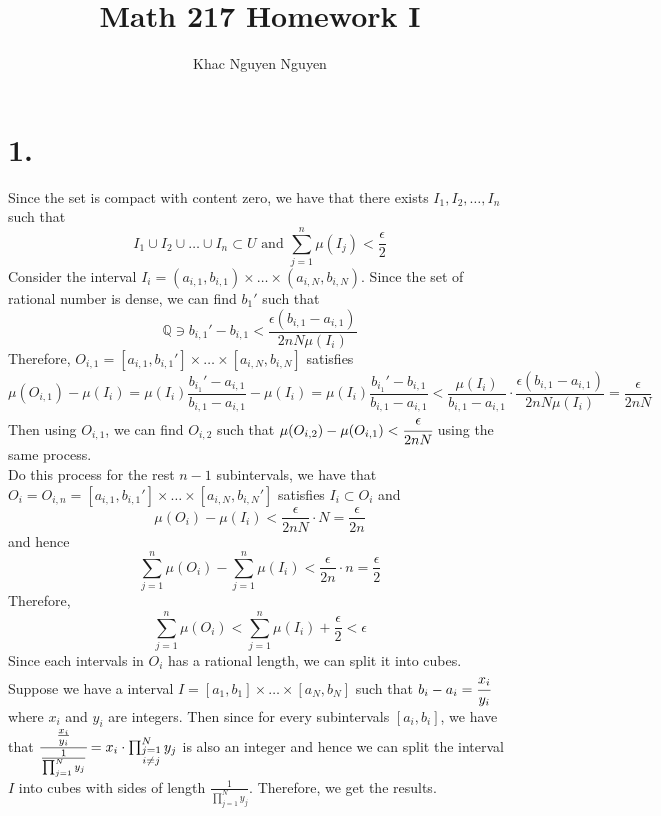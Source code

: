 \documentclass[11pt]{article}
\title{\textbf{Math 217 Homework I}}
\author{Khac Nguyen Nguyen}
\date{}
\begin{document}
\section*{1.}
Since the set is compact with content zero, we have that there exists $I_1, I_2, \ldots, I_n$ such that
\[
    I_1 \cup I_2 \cup \ldots \cup I_n \subset U \text{ and } \sum_{j=1}^n \mu(I_j) < \frac{\epsilon}{2} 
\]
Consider the interval $I_i = (a_{i,1}, b_{i,1}) \times \ldots \times (a_{i,N}, b_{i,N})$. 
Since the set of rational number is dense, we can find $b_1'$ such that 
\[
    \mathbb{Q} \ni b_{i,1}' - b_{i,1} < \frac{\epsilon (b_{i,1}- a_{i,1})}{2nN\mu(I_i)}
\]
Therefore, $O_{i,1} = [a_{i,1}, b_{i,1}'] \times \ldots \times [a_{i,N}, b_{i,N}]$ satisfies
\[
    \mu(O_{i,1}) - \mu(I_i) 
    = \mu(I_i) \frac{b_{i_1}' - a_{i,1}}{b_{i,1} - a_{i,1}} -\mu(I_i) 
    = \mu(I_i)\frac{b_{i_1}' - b_{i,1}}{b_{i,1} - a_{i,1}} 
    < \frac{\mu(I_i)}{b_{i,1} - a_{i,1}} \cdot \frac{\epsilon (b_{i,1}- a_{i,1})}{2nN\mu(I_i)} 
    = \frac{\epsilon}{2nN}
\]
Then using $O_{i,1}$, we can find $O_{i,2}$ such that $\mu(O_{i,2}) - \mu(O_{i,1}) < \cfrac{\epsilon}{2nN}$ using the same process. \\
Do this process for the rest $n-1$ subintervals, 
we have that $O_i = O_{i,n} = [a_{i,1}, b_{i,1}'] \times \ldots \times [a_{i,N}, b_{i,N}']$ satisfies $I_i \subset O_i$ and 
\[
    \mu(O_i) - \mu(I_i) < \frac{\epsilon}{2nN} \cdot N = \frac{\epsilon}{2n}
\]
and hence
\[
    \sum_{j=1}^n \mu(O_i) - \sum_{j=1}^n \mu(I_i) < \frac{\epsilon}{2n} \cdot n = \frac{\epsilon}{2}    
\]
Therefore, 
\[
    \sum_{j=1}^n \mu(O_i) < \sum_{j=1}^n \mu(I_i) + \frac{\epsilon}{2} < \epsilon    
\]
Since each intervals in $O_i$ has a rational length, we can split it into cubes. \\
Suppose we have a interval $I = [a_1,b_1] \times \ldots \times [a_N,b_N]$ such that $b_i - a_i = \cfrac{x_i}{y_i}$ where $x_i$ and $y_i$ are integers. Then
since for every subintervals $[a_i,b_i]$, we have that $\cfrac{\frac{x_i}{y_i}}{\frac{1}{\prod_{j=1}^N y_j}} = x_i \cdot \prod_{\substack{j=1 \\ i\ne j}}^N y_j$ is also an integer and hence
we can split the interval $I$ into cubes with sides of length $\frac{1}{\prod_{j=1}^N y_j}$. Therefore, 
we get the results. 
\pagebreak
\end{document}

